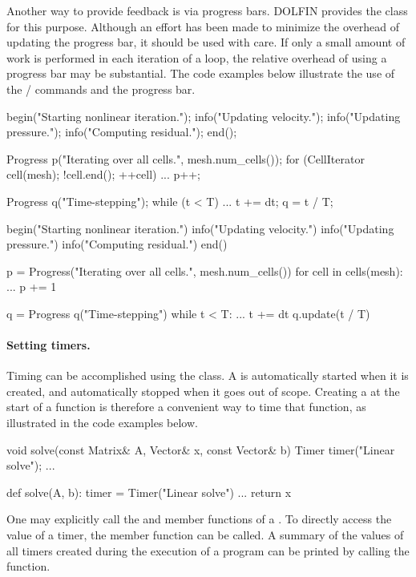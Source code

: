 Another way to provide feedback is via progress bars. DOLFIN provides
the  class for this purpose. Although an effort has been
made to minimize the overhead of updating the progress bar, it should
be used with care. If only a small amount of work is performed in each
iteration of a loop, the relative overhead of using a progress bar
may be substantial. The code examples below illustrate the use of the
/ commands and the progress bar.
\begin{c++}
begin("Starting nonlinear iteration.");
info("Updating velocity.");
info("Updating pressure.");
info("Computing residual.");
end();

Progress p("Iterating over all cells.", mesh.num_cells());
for (CellIterator cell(mesh); !cell.end(); ++cell)
{
  ...
  p++;
}

Progress q("Time-stepping");
while (t < T)
{
  ...
  t += dt;
  q = t / T;
}
\end{c++}
\begin{python}
begin("Starting nonlinear iteration.")
info("Updating velocity.")
info("Updating pressure.")
info("Computing residual.")
end()

p = Progress("Iterating over all cells.", mesh.num_cells())
for cell in cells(mesh):
  ...
  p += 1

q = Progress q("Time-stepping")
while t < T:
  ...
  t += dt
  q.update(t / T)
\end{python}

\paragraph{Setting timers.}

Timing can be accomplished using the  class. A  is
automatically started when it is created, and automatically stopped when
it goes out of scope. Creating a  at the start of a function
is therefore a convenient way to time that function, as illustrated in
the code examples below.
\begin{c++}
void solve(const Matrix& A, Vector& x, const Vector& b)
{
  Timer timer("Linear solve");
  ...
}
\end{c++}
\begin{python}
def solve(A, b):
  timer = Timer("Linear solve")
  ...
  return x
\end{python}
One may explicitly call the  and  member
functions of a . To directly access the value of a timer,
the  member function can be called. A summary of the
values of all timers created during the execution of a program can be
printed by calling the  function.

